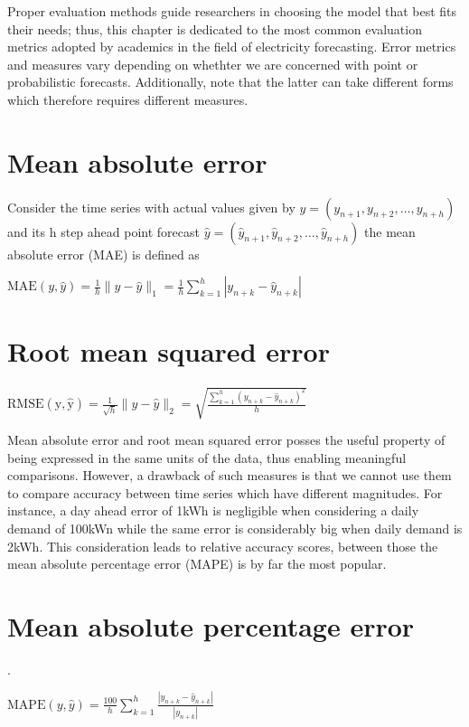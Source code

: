 Proper evaluation methods guide researchers in choosing the model that best fits their needs; thus, this chapter is dedicated to the most common evaluation metrics adopted by academics in the field of electricity forecasting. Error metrics and measures vary depending on whethter we are concerned with point or probabilistic forecasts. Additionally, note that the latter can take different forms which therefore requires different measures.
\section{Mean absolute error}\label{mae}
Consider the time series with actual values given by $y=(y_{n+1}, y_{n+2},\dots, y_{n+h})$
and its h step ahead point forecast $\hat{y}=(\hat{y}_{n+1}, \hat{y}_{n+2},\dots, \hat{y}_{n+h})$ the mean absolute error (MAE) is defined as
\begin{definition}
    $\mathrm{MAE}(y,\hat{y})=\frac{1}{h}\| y- \hat{y}\|_{1}=\frac{1}{h}\sum\limits_{k=1}^{h}|y_{n+k}-\hat{y}_{n+k}|$
\end{definition}

\section{Root mean squared error}\label{rmse}
\begin{definition}
    $\mathrm{RMSE(y, \hat{y})}=\frac{1}{\sqrt{h}}\|y-\hat{y}\|_{2}=\sqrt{\frac{\sum\limits_{k=1}^{h}(y_{n+k}- \hat{y}_{n+k})^2}{h}}$
\end{definition}

Mean absolute error and root mean squared error posses the useful property of being expressed in the same units of the data, thus enabling meaningful comparisons.
However, a drawback of such measures is that we cannot use them to compare accuracy between time series which have different magnitudes. For instance, a day ahead error of 1kWh is negligible when considering a daily demand of 100kWn while the same error is considerably big when daily demand is 2kWh. This consideration leads to relative accuracy scores, between those the mean absolute percentage error (MAPE) is by far the most popular.


\section{Mean absolute percentage error}\label{mape}. 
\begin{definition}
    $\mathrm{MAPE}(y,\hat{y})=\frac{100}{h}\sum\limits_{k=1}^{h}\frac{|y_{n+k}-\hat{y}_{n+k}|}{|y_{n+k}|}$
\end{definition}

